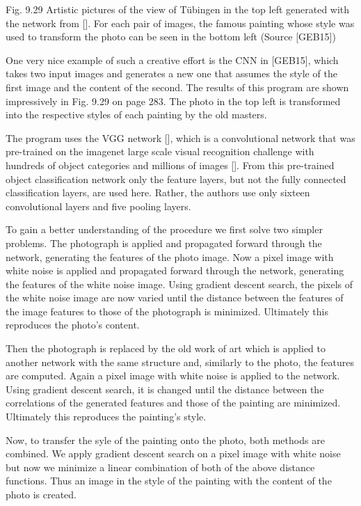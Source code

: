 \documentclass[10pt]{article}
\begin{document}
Fig. 9.29 Artistic pictures of the view of Tübingen in the top left generated with the network from [\cite{gatys2015neural}]. For each pair of images, the famous painting whose style was used to transform the photo can be seen in the bottom left (Source [GEB15])

One very nice example of such a creative effort is the CNN in [GEB15], which takes two input images and generates a new one that assumes the style of the first image and the content of the second. The results of this program are shown impressively in Fig. 9.29 on page 283. The photo in the top left is transformed into the respective styles of each painting by the old masters.


The program uses the VGG network [\cite{simonyan2015very}], which is a convolutional network that was pre-trained on the imagenet large scale visual recognition challenge with hundreds of object categories and millions of images [\cite{russakovsky2015imagenet}]. From this pre-trained object classification network only the feature layers, but not the fully connected classification layers, are used here. Rather, the authors use only sixteen convolutional layers and five pooling layers.

To gain a better understanding of the procedure we first solve two simpler problems. The photograph is applied and propagated forward through the network, generating the features of the photo image. Now a pixel image with white noise is applied and propagated forward through the network, generating the features of the white noise image. Using gradient descent search, the pixels of the white noise image are now varied until the distance between the features of the image features to those of the photograph is minimized. Ultimately this reproduces the photo's content.

Then the photograph is replaced by the old work of art which is applied to another network with the same structure and, similarly to the photo, the features are computed. Again a pixel image with white noise is applied to the network. Using gradient descent search, it is changed until the distance between the correlations of the generated features and those of the painting are minimized. Ultimately this reproduces the painting's style.

Now, to transfer the syle of the painting onto the photo, both methods are combined. We apply gradient descent search on a pixel image with white noise but now we minimize a linear combination of both of the above distance functions. Thus an image in the style of the painting with the content of the photo is created.
\end{document}
